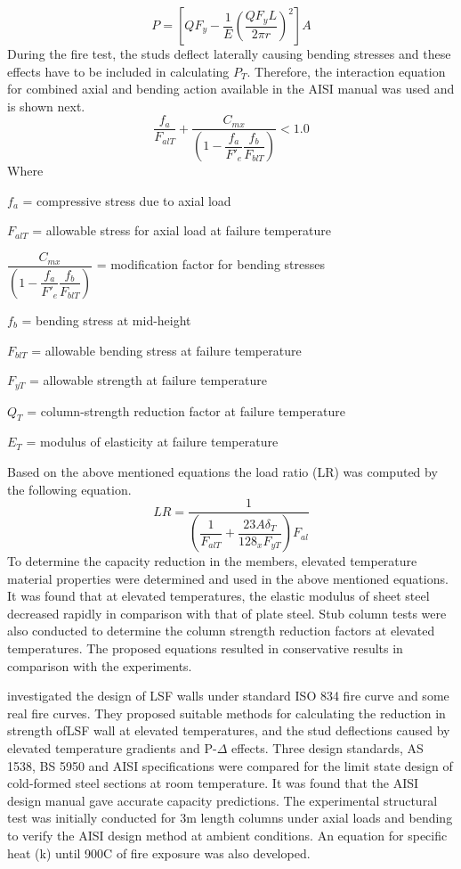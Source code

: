 \begin{equation}
	P = \left[QF_y - \dfrac{1}{E}(\dfrac{QF_yL}{2\pi r})^2\right]A
\end{equation}
During the fire test, the studs deflect laterally causing bending stresses and these effects have to be included in calculating \(P_T\). Therefore, the interaction equation for combined axial and bending action available in the AISI manual was used and is shown next.
\begin{equation}
	\dfrac{f_a}{F_{alT}} + \dfrac{C_{mx}}{\left(1-\dfrac{f_a}{F'_e}\dfrac{f_b}{F_{blT}}\right)} < 1.0
\end{equation} 
Where
\begin{description}[itemsep=0pt,parsep=0pt]
	\item $f_a$ = compressive stress due to axial load
	\item $F_{alT}$ = allowable stress for axial load at failure temperature
	\item $\dfrac{C_{mx}}{\left(1-\dfrac{f_a}{F'_e}\dfrac{f_b}{F_{blT}}\right)}$ = modification factor for bending stresses
	\item $f_b$ = bending stress at mid-height
	\item $F_{blT}$ = allowable bending stress at failure temperature
	\item $F_{yT}$ = allowable strength at failure temperature
	\item $Q_T$ = column-strength reduction factor at failure temperature
	\item $E_T$ = modulus of elasticity at failure temperature
\end{description}
Based on the above mentioned equations the load ratio (LR) was computed by the following equation.
\begin{equation}
	LR = \dfrac{1}{\left(\dfrac{1}{F_{alT}}+\dfrac{23 A \delta _T}{128_xF_{yT}}\right)F_{al}}
\end{equation}
To determine the capacity reduction in the members, elevated temperature material properties were determined and used in the above mentioned equations. It was found that at elevated temperatures, the elastic modulus of sheet steel decreased rapidly in comparison with that of plate steel. Stub column tests were also conducted to determine the column strength reduction factors at elevated temperatures. The proposed equations resulted in conservative results in comparison with the experiments.

\citet{Gerlich1996} investigated the design of LSF walls under standard ISO 834 fire curve and some real fire curves. They proposed suitable methods for calculating the reduction in strength ofLSF wall at elevated temperatures, and the stud deflections caused by elevated temperature gradients and P-$\Delta$ effects. Three design standards, AS 1538, BS 5950 and AISI specifications were compared for the limit state design of cold-formed steel sections at room temperature. It was found that the AISI design manual gave accurate capacity predictions. The experimental structural test was initially conducted for 3m length columns under axial loads and bending to verify the AISI design method at ambient conditions. An equation for specific heat (k) until 900\degree C of fire exposure was also developed.

